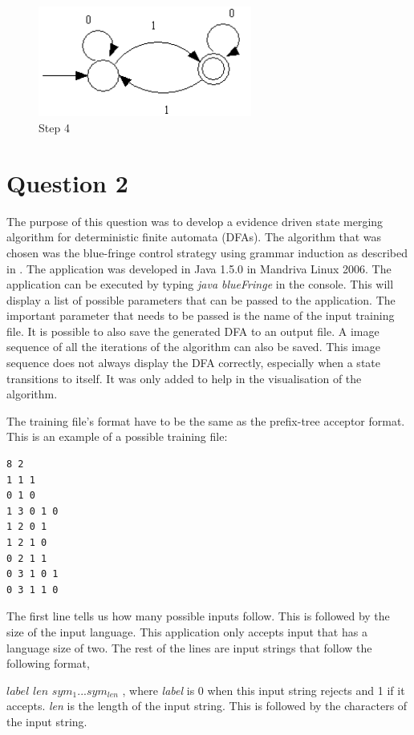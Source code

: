 \documentclass[a4paper,11pt,titlepage]{article}
\begin{document}
\begin{figure}[htbp]
   \centering
   \includegraphics[width=7cm]{tb4.png}
   \caption{Step 4}
   \label{Fig:tb4}
\end{figure}

\section{Question 2}
The purpose of this question was to develop a evidence driven state merging algorithm for deterministic finite automata (DFAs). The algorithm that was chosen was the blue-fringe control strategy using grammar induction as described in \cite{lang}. The application was developed in Java 1.5.0 in Mandriva Linux 2006. The application can be executed by typing \emph{java blueFringe} in the console. This will display a list of possible parameters that can be passed to the application. The important parameter that needs to be passed is the name of the input training file. It is possible to also save the generated DFA to an output file. A image sequence of all the iterations of the algorithm can also be saved. This image sequence does not always display the DFA correctly, especially when a state transitions to itself. It was only added to help in the visualisation of the algorithm.

The training file's format have to be the same as the prefix-tree acceptor format. This is an example of a possible training file:

\begin{verbatim}
8 2
1 1 1
0 1 0
1 3 0 1 0
1 2 0 1
1 2 1 0
0 2 1 1
0 3 1 0 1
0 3 1 1 0
\end{verbatim}

The first line tells us how many possible inputs follow. This is followed by the size of the input language. This application only accepts input that has a language size of two. The rest of the lines are input strings that follow the following format,

$label$ $len$ $sym_1...sym_{len}$
\newline
, where \emph{label} is 0 when this input string rejects and 1 if it accepts. \emph{len} is the length of the input string. This is followed by the characters of the input string.
\end{document}
